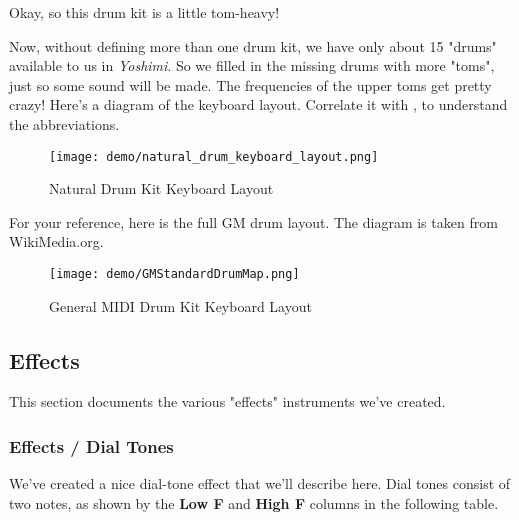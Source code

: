    Okay, so this drum kit is a little tom-heavy!

   Now, without defining more than one drum kit, we have only about 15
   "drums" available to us in \textsl{Yoshimi}.  So we filled in the missing
   drums with more "toms", just so some sound will be made.  The frequencies
   of the upper toms get pretty crazy!  Here's a diagram of the keyboard
   layout.  Correlate it with
   , to understand the
   abbreviations.

\begin{figure}[H]
   \centering 
   \texttt{[image: demo/natural\_drum\_keyboard\_layout.png]}
   \caption{Natural Drum Kit Keyboard Layout}
   \label{fig:cookbook_bank_natural_drum_kit_layout}
\end{figure}

   For your reference, here is the full GM drum layout.  The diagram is
   taken from WikiMedia.org.

\begin{figure}[H]
   \centering 
   \texttt{[image: demo/GMStandardDrumMap.png]}
   \caption{General MIDI Drum Kit Keyboard Layout}
   \label{fig:cookbook_bank_general_drum_kit_layout}
\end{figure}

\subsection{Effects}
\label{subsec:cookbook_instruments_effects}

   This section documents the various "effects" instruments we've created.

\subsubsection{Effects / Dial Tones}
\label{subsubsec:cookbook_instruments_effects_dialtones}

   We've created a nice dial-tone effect that we'll describe here.
   Dial tones consist of two notes, as shown by the
   \textbf{Low F} and \textbf{High F} columns in the following table.

